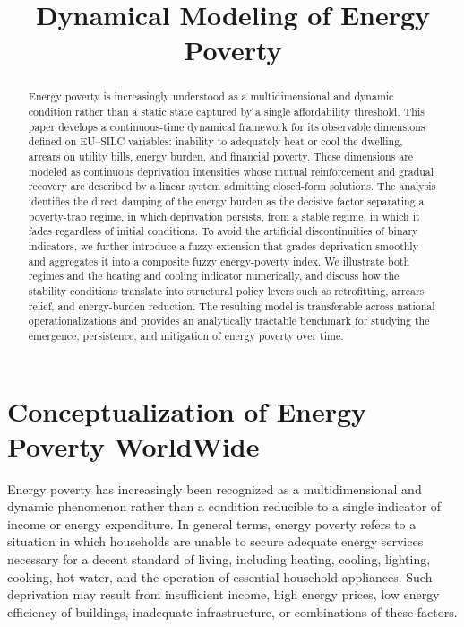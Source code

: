 \documentclass[11pt,a4paper]{article}
\title{Dynamical Modeling of Energy Poverty}
\author{}
\date{}
\begin{document}
\maketitle

\begin{abstract}
Energy poverty is increasingly understood as a multidimensional and dynamic
condition rather than a static state captured by a single affordability
threshold. This paper develops a continuous-time dynamical framework for its
observable dimensions defined on EU--SILC variables: inability to adequately
heat or cool the dwelling, arrears on utility bills, energy burden, and
financial poverty. These dimensions are modeled as continuous deprivation
intensities whose mutual reinforcement and gradual recovery are described by a
linear system admitting closed-form solutions. The analysis identifies the
direct damping of the energy burden as the decisive factor separating a
poverty-trap regime, in which deprivation persists, from a stable regime, in
which it fades regardless of initial conditions. To avoid the artificial
discontinuities of binary indicators, we further introduce a fuzzy extension
that grades deprivation smoothly and aggregates it into a composite fuzzy
energy-poverty index. We illustrate both regimes and the heating and cooling
indicator numerically, and discuss how the stability conditions translate into
structural policy levers such as retrofitting, arrears relief, and energy-burden
reduction. The resulting model is transferable across national
operationalizations and provides an analytically tractable benchmark for
studying the emergence, persistence, and mitigation of energy poverty over time.
\end{abstract}

\section{Conceptualization of Energy Poverty WorldWide}

Energy poverty has increasingly been recognized as a multidimensional and dynamic phenomenon rather than a condition reducible to a single indicator of income or energy expenditure. In general terms, energy poverty refers to a situation in which households are unable to secure adequate energy services necessary for a decent standard of living, including heating, cooling, lighting, cooking, hot water, and the operation of essential household appliances. Such deprivation may result from insufficient income, high energy prices, low energy efficiency of buildings, inadequate infrastructure, or combinations of these factors.
\end{document}
